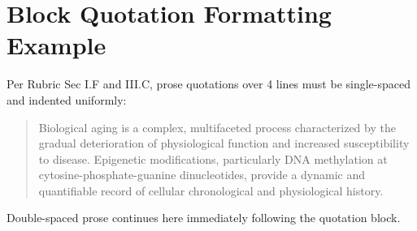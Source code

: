 \section{Block Quotation Formatting Example}
Per Rubric Sec I.F and III.C, prose quotations over 4 lines must be single-spaced and indented uniformly:

\begin{quotation}
  Biological aging is a complex, multifaceted process characterized by the gradual deterioration of physiological function and increased susceptibility to disease. Epigenetic modifications, particularly DNA methylation at cytosine-phosphate-guanine dinucleotides, provide a dynamic and quantifiable record of cellular chronological and physiological history.
\end{quotation}

Double-spaced prose continues here immediately following the quotation block.
